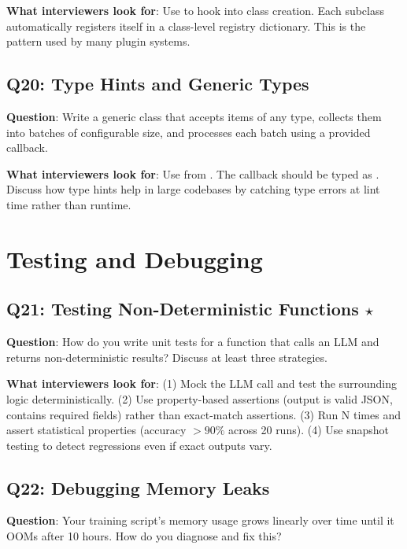\textbf{What interviewers look for}: Use  to hook into class creation. Each subclass automatically registers itself in a class-level registry dictionary. This is the pattern used by many plugin systems.

\subsection{Q20: Type Hints and Generic Types}

\textbf{Question}: Write a generic  class that accepts items of any type, collects them into batches of configurable size, and processes each batch using a provided callback.

\textbf{What interviewers look for}: Use  from . The callback should be typed as . Discuss how type hints help in large codebases by catching type errors at lint time rather than runtime.


\section{Testing and Debugging}

\subsection{Q21: Testing Non-Deterministic Functions $\star$}

\textbf{Question}: How do you write unit tests for a function that calls an LLM and returns non-deterministic results? Discuss at least three strategies.

\textbf{What interviewers look for}: (1) Mock the LLM call and test the surrounding logic deterministically. (2) Use property-based assertions (output is valid JSON, contains required fields) rather than exact-match assertions. (3) Run N times and assert statistical properties (accuracy $> 90\%$ across 20 runs). (4) Use snapshot testing to detect regressions even if exact outputs vary.

\subsection{Q22: Debugging Memory Leaks}

\textbf{Question}: Your training script's memory usage grows linearly over time until it OOMs after 10 hours. How do you diagnose and fix this?

